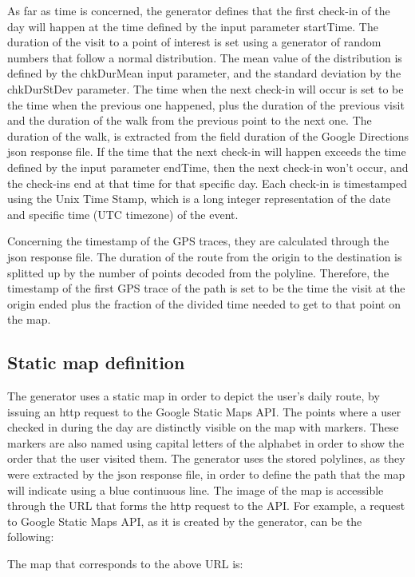 As far as time is concerned, the generator defines that the first check-in of the day will happen at the time defined by the input parameter startTime. 
The duration of the visit to a point of interest is set 
using a generator of random numbers that follow a normal distribution. The mean value of the distribution is defined by the chkDurMean input parameter, and 
the standard deviation by the chkDurStDev parameter. The time when the next check-in will occur is set to be the time when the previous one happened, plus 
the duration of the previous visit and the duration of the walk from the previous point to the next one. The duration of the walk, is extracted from 
the field duration of the Google Directions json response file. If the time that the next check-in will happen exceeds the time defined by the input parameter 
endTime, then the next check-in won't occur, and the check-ins end at that time for that specific day. Each check-in is timestamped 
using the Unix Time Stamp, which is a long integer representation of the date and specific time (UTC timezone) of the event.

Concerning the timestamp of the GPS traces, they are calculated through the json response file. The duration of the route from the origin to the destination is 
splitted up by the number of points decoded from the polyline. Therefore, the timestamp of the first GPS trace of the path is set to be the time the visit 
at the origin ended plus the fraction of the divided time needed to get to that point on the map.

\subsection{Static map definition}

The generator uses a static map in order to depict the user's daily route, by issuing an http request to the Google Static Maps API. 
The points where a user checked in during the day are distinctly visible on the map with markers. These markers are also named using capital 
letters of the alphabet in order to show the order that the user visited them. The generator uses the stored polylines, as they were extracted by the json 
response file, in order to define the path that the map will indicate using a blue continuous line. The image of the map is accessible through the URL that 
forms the http request to the API.
For example, a request to Google Static Maps API, 
as it is created by the generator, can be the following:
\begin{center}
\end{center}
The map that corresponds to the above URL is:

